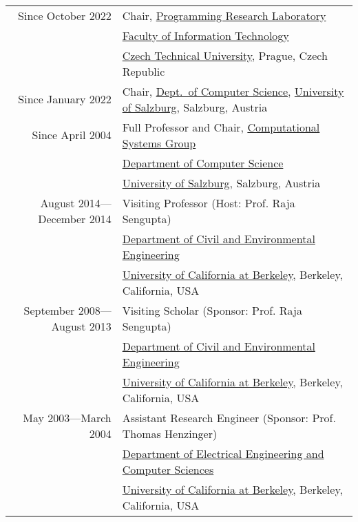  \\
\begin{tabular}{rl}
Since October 2022 & Chair, \href{https://prl-prg.github.io}{Programming Research Laboratory} \\
                 & \href{https://fit.cvut.cz}{Faculty of Information Technology} \\
                 & \href{https://cvut.cz}{Czech Technical University}, Prague, Czech Republic \\
\noalign{\smallskip}
Since January 2022 & Chair, \href{https://informatik.uni-salzburg.at}{Dept.~of Computer Science}, \href{https://plus.ac.at}{University of Salzburg}, Salzburg, Austria \\
\noalign{\smallskip}
Since April 2004 & Full Professor and Chair, \href{http://www.cs.uni-salzburg.at/~ck}{Computational Systems Group} \\
                 & \href{https://informatik.uni-salzburg.at}{Department of Computer Science} \\
                 & \href{https://plus.ac.at}{University of Salzburg}, Salzburg, Austria \\
\noalign{\smallskip}
August 2014---December 2014 & Visiting Professor (Host: Prof. Raja Sengupta)\\
                            & \href{http://www.ce.berkeley.edu}{Department of Civil and Environmental Engineering} \\
                            & \href{http://www.berkeley.edu}{University of California at Berkeley}, Berkeley, California, USA \\
\noalign{\smallskip}
September 2008---August 2013 & Visiting Scholar (Sponsor: Prof. Raja Sengupta)\\
                             & \href{http://www.ce.berkeley.edu}{Department of Civil and Environmental Engineering} \\
                             & \href{http://www.berkeley.edu}{University of California at Berkeley}, Berkeley, California, USA \\
\noalign{\smallskip}
May 2003---March 2004 & Assistant Research Engineer (Sponsor: Prof. Thomas Henzinger)\\
                      & \href{http://www.eecs.berkeley.edu}{Department of Electrical Engineering and Computer Sciences} \\
                      & \href{http://www.berkeley.edu}{University of California at Berkeley}, Berkeley, California, USA \\

\end{tabular}
